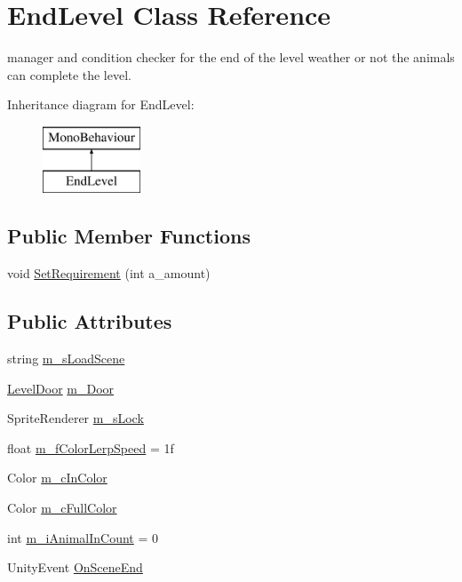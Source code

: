 \hypertarget{class_end_level}{}\section{End\+Level Class Reference}
\label{class_end_level}


manager and condition checker for the end of the level weather or not the animals can complete the level.  


Inheritance diagram for End\+Level\+:\begin{figure}[H]
\begin{center}
\leavevmode
\includegraphics[height=2.000000cm]{class_end_level}
\end{center}
\end{figure}
\subsection*{Public Member Functions}
\begin{DoxyCompactItemize}
\item 
void \mbox{\hyperlink{class_end_level_ac48a9108348a9c62626414ee6f67904e}{Set\+Requirement}} (int a\+\_\+amount)
\end{DoxyCompactItemize}
\subsection*{Public Attributes}
\begin{DoxyCompactItemize}
\item 
string \mbox{\hyperlink{class_end_level_a423a1965b736e789570df5b999cca083}{m\+\_\+s\+Load\+Scene}}
\item 
\mbox{\hyperlink{class_level_door}{Level\+Door}} \mbox{\hyperlink{class_end_level_a036dc1845d6fe9fd631fb31f350009de}{m\+\_\+\+Door}}
\item 
Sprite\+Renderer \mbox{\hyperlink{class_end_level_ad6204a7c789a816b624d2fac2a2b5ff5}{m\+\_\+s\+Lock}}
\item 
float \mbox{\hyperlink{class_end_level_a7dc1e9d7ced27122312026f653c57e79}{m\+\_\+f\+Color\+Lerp\+Speed}} = 1f
\item 
Color \mbox{\hyperlink{class_end_level_a5d91634ee86e56d143e50429aa517406}{m\+\_\+c\+In\+Color}}
\item 
Color \mbox{\hyperlink{class_end_level_a8ec4e8037b14d41af57ac898663cda1b}{m\+\_\+c\+Full\+Color}}
\item 
int \mbox{\hyperlink{class_end_level_aac7bb140ac04219dd7977b64045528fe}{m\+\_\+i\+Animal\+In\+Count}} = 0
\item 
Unity\+Event \mbox{\hyperlink{class_end_level_aee1d2eed042bef3561adbc3697824cac}{On\+Scene\+End}}
\end{DoxyCompactItemize}


